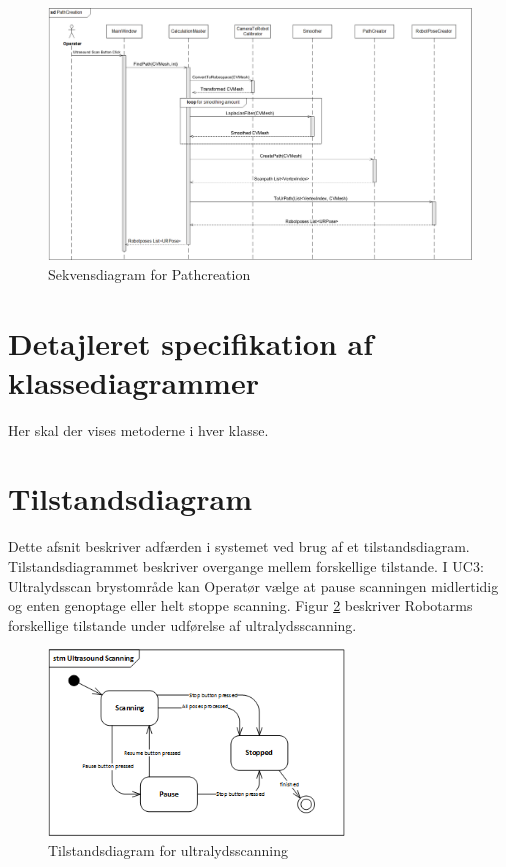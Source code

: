 \begin{figure}[H]
    \centering
    \includegraphics[width=1.4\textwidth, angle =90]{figurer/d/Design/Sequence/sd_ultrascan}
    \caption{Sekvensdiagram for Pathcreation}
    \label{sd_ultrascan}
\end{figure}
\newpage

\section{Detajleret specifikation af klassediagrammer}
Her skal der vises metoderne i hver klasse. 

\section{Tilstandsdiagram}
Dette afsnit beskriver adfærden i systemet ved brug af et tilstandsdiagram. Tilstandsdiagrammet beskriver overgange mellem forskellige tilstande. I UC3: Ultralydsscan brystområde kan Operatør vælge at pause scanningen midlertidig og enten genoptage eller helt stoppe scanning. Figur \ref{stm_Ultra} beskriver Robotarms forskellige tilstande under udførelse af ultralydsscanning. 

\begin{figure}[H]
    \centering
    \includegraphics[width=0.7\textwidth]{figurer/d/Design/stm_UC3}
    \caption{Tilstandsdiagram for ultralydsscanning}
    \label{stm_Ultra}
\end{figure}



